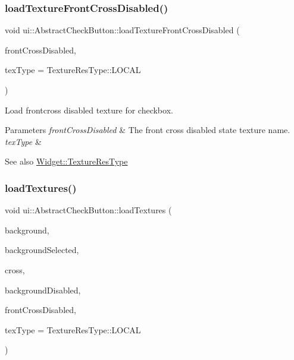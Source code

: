 \subsubsection{\texorpdfstring{load\+Texture\+Front\+Cross\+Disabled()}{loadTextureFrontCrossDisabled()}\hspace{0.1cm}{\footnotesize\ttfamily [2/2]}}
{\footnotesize\ttfamily void ui\+::\+Abstract\+Check\+Button\+::load\+Texture\+Front\+Cross\+Disabled (\begin{DoxyParamCaption}\item[{const std\+::string \&}]{front\+Cross\+Disabled,  }\item[{\hyperlink{classui_1_1Widget_a040a65ec5ad3b11119b7e16b98bd9af0}{Texture\+Res\+Type}}]{tex\+Type = {\ttfamily TextureResType\+:\+:LOCAL} }\end{DoxyParamCaption})}

Load frontcross disabled texture for checkbox.


\begin{DoxyParams}{Parameters}
{\em front\+Cross\+Disabled} & The front cross disabled state texture name. \\
\hline
{\em tex\+Type} & \\
\hline
\end{DoxyParams}
\begin{DoxySeeAlso}{See also}
{\ttfamily \hyperlink{classui_1_1Widget_a040a65ec5ad3b11119b7e16b98bd9af0}{Widget\+::\+Texture\+Res\+Type}} 
\end{DoxySeeAlso}
\mbox{\label{classui_1_1AbstractCheckButton_a4d375837cd83ff2008fffecf3a5ed1ac}} 
\subsubsection{\texorpdfstring{load\+Textures()}{loadTextures()}\hspace{0.1cm}{\footnotesize\ttfamily [1/2]}}
{\footnotesize\ttfamily void ui\+::\+Abstract\+Check\+Button\+::load\+Textures (\begin{DoxyParamCaption}\item[{const std\+::string \&}]{background,  }\item[{const std\+::string \&}]{background\+Selected,  }\item[{const std\+::string \&}]{cross,  }\item[{const std\+::string \&}]{background\+Disabled,  }\item[{const std\+::string \&}]{front\+Cross\+Disabled,  }\item[{\hyperlink{classui_1_1Widget_a040a65ec5ad3b11119b7e16b98bd9af0}{Texture\+Res\+Type}}]{tex\+Type = {\ttfamily TextureResType\+:\+:LOCAL} }\end{DoxyParamCaption})}

